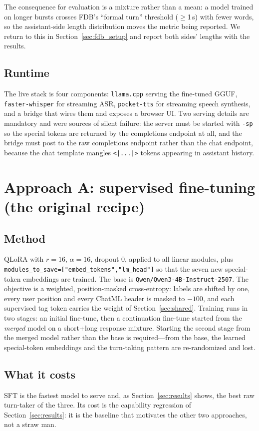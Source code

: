 \documentclass[conference]{IEEEtran}
\begin{document}
The consequence for evaluation is a mixture rather than a mean: a model trained
on longer bursts crosses FDB's ``formal turn'' threshold ($\ge$1\,s) with fewer
words, so the assistant-side length distribution moves the metric being reported.
We return to this in Section~\ref{sec:fdb_setup} and report both sides' lengths
with the results.

\subsection{Runtime}
The live stack is four components: \texttt{llama.cpp} serving the fine-tuned GGUF,
\texttt{faster-whisper} for streaming ASR, \texttt{pocket-tts} for streaming
speech synthesis, and a bridge that wires them and exposes a browser UI. Two
serving details are mandatory and were sources of silent failure: the server must
be started with \texttt{-sp} so the special tokens are returned by the completions
endpoint at all, and the bridge must post to the raw completions endpoint rather
than the chat endpoint, because the chat template mangles \texttt{<|...|>} tokens
appearing in assistant history.

\section{Approach A: supervised fine-tuning (the original recipe)}
\label{sec:sft}

\subsection{Method}
QLoRA with $r{=}16$, $\alpha{=}16$, dropout 0, applied to all linear modules,
plus \texttt{modules\_to\_save=["embed\_tokens","lm\_head"]} so that the seven new
special-token embeddings are trained. The base is
\texttt{Qwen/Qwen3-4B-Instruct-2507}. The objective is a weighted,
position-masked cross-entropy: labels are shifted by one, every user position and
every ChatML header is masked to $-100$, and each supervised tag token carries the
weight of Section~\ref{sec:shared}. Training runs in two stages: an initial
fine-tune, then a continuation fine-tune started from the \emph{merged} model on
a short+long response mixture. Starting the second stage from the merged model
rather than the base is required---from the base, the learned special-token
embeddings and the turn-taking pattern are re-randomized and lost.

\subsection{What it costs}
SFT is the fastest model to serve and, as Section~\ref{sec:results} shows, the
best raw turn-taker of the three. Its cost is the capability regression of
Section~\ref{sec:results}: it is the baseline that motivates the other two
approaches, not a straw man.
\end{document}
